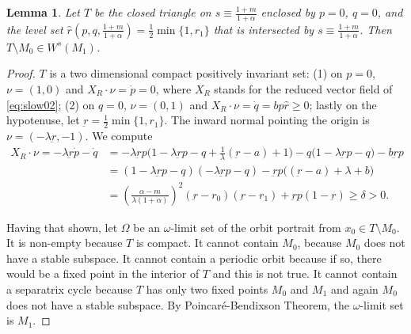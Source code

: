 \documentclass[a4paper,11pt]{article}
\newtheorem{lemma}{Lemma}[section]
\theoremstyle{remark}
\begin{document}
\begin{lemma} \label{lem:T}
 Let $T$ be the closed triangle on $s\equiv \frac{1+m}{1+\alpha}$ enclosed by $p=0$, $q=0$, and the level set $\hat{r}(p,q,\frac{1+m}{1+\alpha})= \frac{1}{2}\min\{1,r_1\}$ that is intersected by $s\equiv \frac{1+m}{1+\alpha}$. 
 Then $T\setminus M_0 \in W^s(M_1)$.
\end{lemma}
\begin{proof}
$T$ is a two dimensional compact positively invariant set: (1) on $p=0$, $\nu = (1,0)$ and $X_R\cdot\nu = \dot{p}=0$, where $X_R$ stands for the reduced vector field of \eqref{eq:slow02};
 (2) on $q=0$, $\nu = (0,1)$ and $X_R\cdot\nu=\dot{q} = bp\hat{r}\ge0$; lastly on the hypotenuse, let $\underbar{r}=\frac{1}{2}\min\{1,r_1\}$. The inward normal pointing the origin is $\nu = (-\lambda\underbar{r}, -1)$. We compute
  \begin{align}
  X_R\cdot\nu=-\lambda\underbar{r}\dot{p} -\dot{q}&= -\lambda \underbar{r}p \Big(1-\lambda \underbar{r}p -q + \frac{1}{\lambda}(\underbar{r}-a)+1\Big) - q(1-\lambda \underbar{r}p -q\big) - b \underbar{r}p \nonumber\\
  &= (1-\lambda \underbar{r}p -q)(-\lambda \underbar{r}p -q) -\underbar{r}p\Big((\underbar{r}-a)+\lambda+b\Big)\nonumber\\
  &= \left(\frac{\alpha-m}{\lambda(1+\alpha)}\right)^2(\underbar{r}-r_0)(\underbar{r}-r_1)+\underbar{r}p(1-\underbar{r})\ge \delta>0. \label{eq:affine}
 \end{align}

Having that shown, let $\Omega$ be an $\omega$-limit set of the orbit portrait from $x_0\in T\setminus M_0$. It is non-empty because $T$ is compact. It cannot contain $M_0$, because $M_0$ does not have a stable subspace. It cannot contain a periodic orbit because if so, there would be a fixed point in the interior of $T$ and this is not true. 
It cannot contain a separatrix cycle because $T$ has only two fixed points $M_0$ and $M_1$ and again $M_0$ does not have a stable subspace.  By Poincar\'e-Bendixson Theorem, the $\omega$-limit set is $M_1$.
\end{proof}
\end{document}

